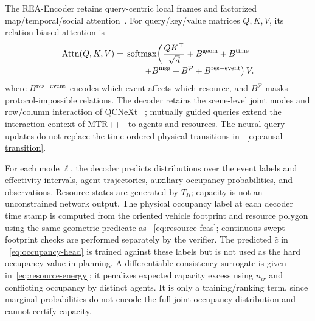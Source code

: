 \documentclass[letterpaper]{article} %
\newcommand{\Pset}{\ensuremath{\mathcal P}}
\begin{document}
The REA-Encoder retains query-centric local frames and factorized
map/temporal/social attention~\citep{zhou2023query}. For query/key/value
matrices $Q,K,V$, its relation-biased attention is
\begin{equation}
\begin{aligned}
\operatorname{Attn}(Q,K,V)= {}&
\operatorname{softmax}\!\left(\frac{QK^\top}{\sqrt d}
+B^{\rm geom}+B^{\rm time}\right.\\[-2pt]
&\left.\qquad+B^{\rm msg}+B^{\Pset}+B^{\rm res-event}\right)V.
\end{aligned}
\label{eq:rea-attn-app}
\end{equation}
where $B^{\rm res-event}$ encodes which event affects which resource, and
$B^{\Pset}$ masks protocol-impossible relations. The decoder retains the
scene-level joint modes and row/column interaction of QCNeXt
~\citep{zhou2023qcnext}; mutually guided queries extend the interaction
context of MTR++~\citep{shi2024mtr++} to agents and resources. The neural
query updates do not replace the time-ordered physical transitions in
~\eqref{eq:causal-transition}.

For each mode $\ell$, the decoder predicts distributions over the event
labels and effectivity intervals, agent trajectories, auxiliary occupancy
probabilities, and observations. Resource states are generated by $T_R$;
capacity is not an unconstrained network output. The physical occupancy
label at each decoder time stamp is computed from the oriented vehicle
footprint and resource polygon using the same geometric predicate as
~\eqref{eq:resource-feas}; continuous swept-footprint checks are performed
separately by the verifier. The predicted $\widehat c$ in
~\eqref{eq:occupancy-head} is trained against these labels but is not used
as the hard occupancy value in planning. A differentiable consistency
surrogate is given in~\eqref{eq:resource-energy}; it penalizes expected
capacity excess using $n_{ir}$ and conflicting occupancy by distinct agents.
It is only a training/ranking term, since marginal probabilities do not
encode the full joint occupancy distribution and cannot certify capacity.
\end{document}
